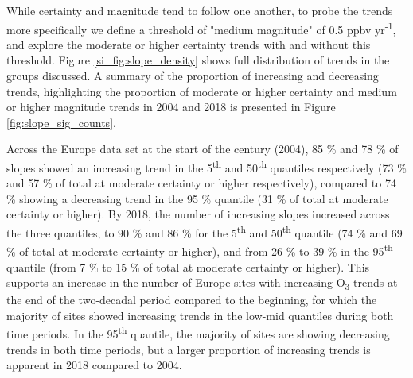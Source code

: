 \documentclass[journal abbreviation, manuscript]{copernicus}
\begin{document}
While certainty and magnitude tend to follow one another, to probe the trends more specifically we define a threshold of "medium magnitude" of 0.5 ppbv yr\textsuperscript{-1}, and explore the moderate or higher certainty trends with and without this threshold. Figure \ref{si_fig:slope_density} shows full distribution of trends in the groups discussed. A summary of the proportion of increasing and decreasing trends, highlighting the proportion of moderate or higher certainty and medium or higher magnitude trends in 2004 and 2018 is presented in Figure \ref{fig:slope_sig_counts}.

Across the Europe data set at the start of the century (2004), 85 \% and 78 \% of slopes showed an increasing trend in the 5\textsuperscript{th} and 50\textsuperscript{th} quantiles respectively (73 \% and 57 \% of total at moderate certainty or higher respectively), compared to 74 \% showing a decreasing trend in the 95 \% quantile (31 \% of total at moderate certainty or higher). By 2018, the number of increasing slopes increased across the three quantiles, to 90 \% and 86 \% for the 5\textsuperscript{th} and 50\textsuperscript{th} quantile (74 \% and 69 \% of total at moderate certainty or higher), and from 26 \% to 39 \% in the 95\textsuperscript{th} quantile (from 7 \% to 15 \% of total at moderate certainty or higher). This supports an increase in the number of Europe sites with increasing O\textsubscript{3} trends at the end of the two-decadal period compared to the beginning, for which the majority of sites showed increasing trends in the low-mid quantiles during both time periods. In the 95\textsuperscript{th} quantile, the majority of sites are showing decreasing trends in both time periods, but a larger proportion of increasing trends is apparent in 2018 compared to 2004. 
\end{document}
